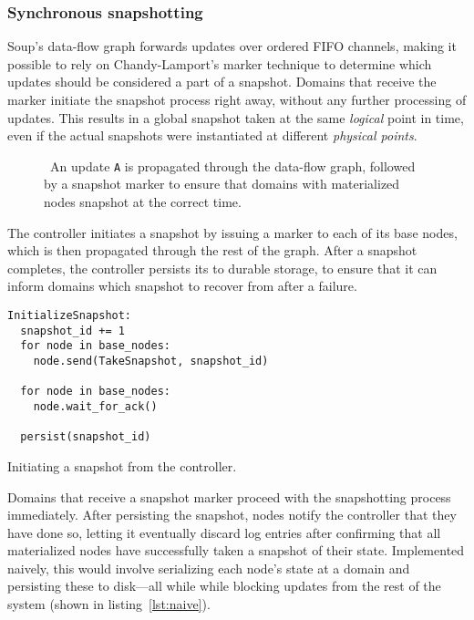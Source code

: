 \subsubsection{Synchronous snapshotting}

Soup's data-flow graph forwards updates over ordered FIFO channels, making it
possible to rely on Chandy-Lamport's marker technique to determine which updates
should be considered a part of a snapshot. Domains that receive the
marker initiate the snapshot process right away, without any further processing
of updates. This results in a global snapshot taken at the same \textit{logical}
point in time, even if the actual snapshots were instantiated at different
\textit{physical points}.

\begin{figure}[H]
  \centering
  
  \caption{\
    An update \texttt{A} is propagated through the data-flow graph, followed by
    a snapshot marker to ensure that domains with materialized nodes snapshot at
    the correct time.
  }\label{good-example}
\end{figure}

The controller initiates a snapshot by issuing a  marker to
each of its base nodes, which is then propagated through the rest of the graph.
After a snapshot completes, the controller persists its \code{snapshot\_id} to
durable storage, to ensure that it can inform domains which snapshot to recover
from after a failure.

\begin{listing}[H]
  \begin{verbatim}
InitializeSnapshot:
  snapshot_id += 1
  for node in base_nodes:
    node.send(TakeSnapshot, snapshot_id)

  for node in base_nodes:
    node.wait_for_ack()

  persist(snapshot_id)
  \end{verbatim}

  \caption{Initiating a snapshot from the controller.}
\end{listing}

Domains that receive a snapshot marker proceed with the snapshotting process
immediately. After persisting the snapshot, nodes notify the controller that
they have done so, letting it eventually discard log entries after confirming
that all materialized nodes have successfully taken a snapshot of their state.
Implemented naively, this would involve serializing each node's state at a
domain and persisting these to disk---all while while blocking updates from the
rest of the system (shown in listing~\ref{lst:naive}).


